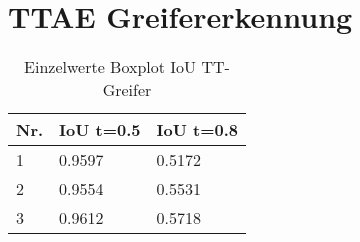 \chapter{TTAE Greifererkennung}
\label{appendix:TTAEGreifer }

	
	
	\begin{table}[ht]
		\centering
		\begin{tabularx}{\textwidth}{lll}
			\textbf{Nr.}  & \textbf{IoU t=0.5} & \textbf{IoU t=0.8}  	 \\ \hline 
			1 & 0.9597 & 0.5172  \\
			2 & 0.9554 & 0.5531 \\
			3 & 0.9612 & 0.5718 \\
		\end{tabularx}
		\caption{Einzelwerte Boxplot IoU TT-Greifer}
		\label{table:EinzelwerteBoxplotIoUTTGreifer}
	\end{table}
